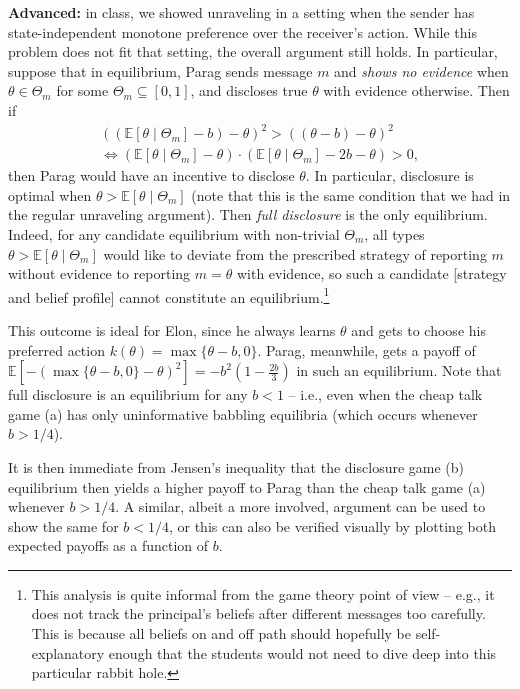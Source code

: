 \documentclass[a4paper]{article}
\begin{document}
\begin{enumerate}[label={(\alph{enumi})}]
	\textbf{Advanced:} in class, we showed unraveling in a setting when the sender has state-independent monotone preference over the receiver's action. While this problem does not fit that setting, the overall argument still holds.
	In particular, suppose that in equilibrium, Parag sends message $m$ and \emph{shows no evidence} when $\theta \in \Theta_m$ for some $\Theta_m \subseteq [0,1]$, and discloses true $\theta$ with evidence otherwise. Then if
	\begin{align*}
		\left( (\mathbb{E}[\theta \mid \Theta_m]-b) - \theta \right)^2 > \left( (\theta-b) - \theta \right)^2
		\\
		\iff
		\left( \mathbb{E}[\theta \mid \Theta_m] - \theta \right) \cdot \left( \mathbb{E}[\theta \mid \Theta_m] - 2b - \theta \right) > 0,
	\end{align*}
	then Parag would have an incentive to disclose $\theta$. In particular, disclosure is optimal when $\theta > \mathbb{E}[\theta \mid \Theta_m]$ (note that this is the same condition that we had in the regular unraveling argument). Then \emph{full disclosure} is the only equilibrium. Indeed, for any candidate equilibrium with non-trivial $\Theta_m$, all types $\theta > \mathbb{E}[\theta \mid \Theta_m]$ would like to deviate from the prescribed strategy of reporting $m$ without evidence to reporting $m=\theta$  with evidence, so such a candidate [strategy and belief profile] cannot constitute an equilibrium.\footnote{This analysis is quite informal from the game theory point of view -- e.g., it does not track the principal's beliefs after different messages too carefully. This is because all beliefs on and off path should hopefully be self-explanatory enough that the students would not need to dive deep into this particular rabbit hole.}
	
	This outcome is ideal for Elon, since he always learns $\theta$ and gets to choose his preferred action $k(\theta)=\max\{\theta-b, 0\}$. Parag, meanwhile, gets a payoff of $\mathbb{E}\left[ -\left( \max\{ \theta-b, 0 \} - \theta \right)^2 \right] = -b^2 \left( 1 -\frac{2b}{3} \right)$ in such an equilibrium. Note that full disclosure is an equilibrium for any $b < 1$ -- i.e., even when the cheap talk game (a) has only uninformative babbling equilibria (which occurs whenever $b > 1/4$).
	
	It is then immediate from Jensen's inequality that the disclosure game (b) equilibrium then yields a higher payoff to Parag than the cheap talk game (a) whenever $b > 1/4$. A similar, albeit a more involved, argument can be used to show the same for $b < 1/4$, or this can also be verified visually by plotting both expected payoffs as a function of $b$.
	

\end{enumerate}
\end{document}
